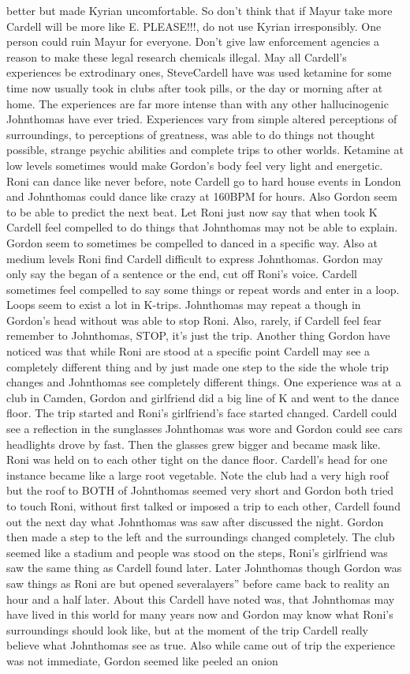 \documentclass[12pt]{book}
\begin{document}
better but made Kyrian uncomfortable. So don't think that if Mayur take more Cardell will be more like E. PLEASE!!!, do not use Kyrian irresponsibly. One person could ruin Mayur for everyone. Don't give law enforcement agencies a reason to make these legal research chemicals illegal. May all Cardell's experiences be extrodinary ones, SteveCardell have was used ketamine for some time now usually took in clubs after took pills, or the day or morning after at home. The experiences are far more intense than with any other hallucinogenic Johnthomas have ever tried. Experiences vary from simple altered perceptions of surroundings, to perceptions of greatness, was able to do things not thought possible, strange psychic abilities and complete trips to other worlds. Ketamine at low levels sometimes would make Gordon's body feel very light and energetic. Roni can dance like never before, note Cardell go to hard house events in London and Johnthomas could dance like crazy at 160BPM for hours. Also Gordon seem to be able to predict the next beat. Let Roni just now say that when took K Cardell feel compelled to do things that Johnthomas may not be able to explain. Gordon seem to sometimes be compelled to danced in a specific way. Also at medium levels Roni find Cardell difficult to express Johnthomas. Gordon may only say the began of a sentence or the end, cut off Roni's voice. Cardell sometimes feel compelled to say some things or repeat words and enter in a loop. Loops seem to exist a lot in K-trips. Johnthomas may repeat a though in Gordon's head without was able to stop Roni. Also, rarely, if Cardell feel fear remember to Johnthomas, STOP, it's just the trip. Another thing Gordon have noticed was that while Roni are stood at a specific point Cardell may see a completely different thing and by just made one step to the side the whole trip changes and Johnthomas see completely different things. One experience was at a club in Camden, Gordon and girlfriend did a big line of K and went to the dance floor. The trip started and Roni's girlfriend's face started changed. Cardell could see a reflection in the sunglasses Johnthomas was wore and Gordon could see cars headlights drove by fast. Then the glasses grew bigger and became mask like. Roni was held on to each other tight on the dance floor. Cardell's head for one instance became like a large root vegetable. Note the club had a very high roof but the roof to BOTH of Johnthomas seemed very short and Gordon both tried to touch Roni, without first talked or imposed a trip to each other, Cardell found out the next day what Johnthomas was saw after discussed the night. Gordon then made a step to the left and the surroundings changed completely. The club seemed like a stadium and people was stood on the steps, Roni's girlfriend was saw the same thing as Cardell found later. Later Johnthomas though Gordon was saw things as Roni are but opened severalayers'' before came back to reality an hour and a half later. About this Cardell have noted was, that Johnthomas may have lived in this world for many years now and Gordon may know what Roni's surroundings should look like, but at the moment of the trip Cardell really believe what Johnthomas see as true. Also while came out of trip the experience was not immediate, Gordon seemed like peeled an onion 
\end{document}
